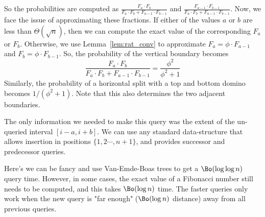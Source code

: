 So the probabilities are computed as $\frac{F_a\cdot F_b}{F_a\cdot F_b + F_{a-1}\cdot F_{b-1}}$
and $\frac{F_{a-1}\cdot F_{b-1}}{F_a\cdot F_b + F_{a-1}\cdot F_{b-1}}$.
Now, we face the issue of approximating these fractions.
If either of the values $a$ or $b$ are less than $\Theta(\sqrt n)$,
then we can compute the exact value of the corresponding $F_a$ or $F_b$.
Otherwise, we use Lemma~\ref{lem:rat_conv} to approximate $F_a=\phi\cdot F_{a-1}$ and $F_b=\phi\cdot F_{b-1}$.
So, the probability of the vertical boundary becomes
$$
\frac{F_a\cdot F_b}{F_a\cdot F_b + F_{a-1}\cdot F_{b-1}} = \frac{\phi^2}{\phi^2+1}
$$
Similarly, the probability of a horizontal split with a top and bottom domino becomes $1/(\phi^2+1)$.
Note that this also determines the two adjacent boundaries.

The only information we needed to make this query was the extent of the un-queried interval $[i-a, i+b]$.
We can use any standard data-structure that allows insertion in positions $\{1, 2\cdots,n+1\}$,
and provides successor and predecessor queries.

Here's we can be fancy and use Van-Emde-Boas trees to get a $\Bo(\log\log n)$ query time.
However, in some cases, the exact value of a Fibonacci number still needs to be computed, and this takes $\Bo(\log n)$ time.
The faster queries only work when the new query is "far enough" ($\Bo(\log n)$ distance) away from all previous queries.

